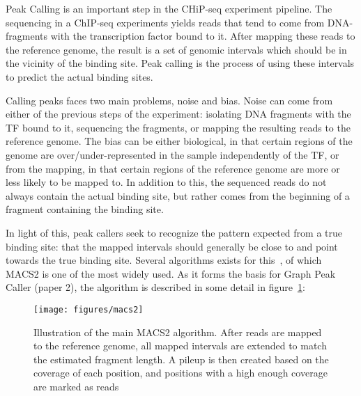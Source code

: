 Peak Calling is an important step in the CHiP-seq experiment pipeline.
The sequencing in a ChIP-seq experiments yields reads that tend to come from DNA-fragments with the transcription factor bound to it. After mapping these reads to the reference genome, the result is a set of genomic intervals which should be in the vicinity of the binding site. Peak calling is the process of using these intervals to predict the actual binding sites. 

Calling peaks faces two main problems, noise and bias. Noise can come from either of the previous steps of the experiment: isolating DNA fragments with the TF bound to it, sequencing the fragments, or mapping the resulting reads to the reference genome. The bias can be either biological, in that certain regions of the genome are over/under-represented in the sample independently of the TF, or from the mapping, in that certain regions of the reference genome are more or less likely to be mapped to. In addition to this, the sequenced reads do not always contain the actual binding site, but rather comes from the beginning of a fragment containing the binding site. 

In light of this, peak callers seek to recognize the pattern expected from a true binding site: that the mapped intervals should generally be close to and point towards the true binding site.
Several algorithms exists for this~\cite{SPP, MACS2, MACS, }, of which MACS2 is one of the most widely used. As it forms the basis for Graph Peak Caller (paper 2), the algorithm is described in some detail in figure~\ref{fig:macs}:

\begin{figure}
  \texttt{[image: figures/macs2]}
  \caption{Illustration of the main MACS2 algorithm. After reads are mapped to the reference genome, all mapped intervals are extended to match the estimated fragment length. A pileup is then created based on the coverage of each position, and positions with a high enough coverage are marked as reads}
  \label{fig:macs}
\end{figure}

% 
% 
% 
% 
% 
% 
% 
% 
% 
% 
% 
% 
% 
% 
% 
% 
% 
% 
% 
% 
% 
% 
% 
% 
% 
% 
% 
% 
% 
% 
% 
% 
% 
% 
% 
% 
% 
% 
% 
% 
% 
% 
% 
% 
% 
% 
% 
% 
% 
% 
% 
% 
% 
% 
% 
% 
% 
% 
% 
% 
% 
% 
% 
% 
% 
% 
% 
% 
% 
% 
% 
% 
% 
% 
% 
% 
% 
% 
% 
% 
% 
% 
% 
% 
% 
% 
% 
% 
% 
% 
% 
% 
% 
% 
% 
% 
% 
% 
% 
% 
% 
% 
% 
% 
% 
% 
% 
% 
% 
% 
